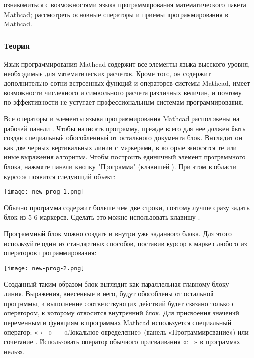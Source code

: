 
\goal ознакомиться с возможностями языка программирования математического пакета Mathcad; рассмотреть основные операторы и приемы программирования в Mathcad.

\subsubsection{Теория}
Язык программирования Mathcad содержит все элементы языка высокого уровня, необходимые для математических расчетов. Кроме того, он содержит дополнительно сотни встроенных функций и операторов системы Mathcad, имеет возможности численного и символьного расчета различных величин, и поэтому по эффективности не уступает профессиональным системам программирования.

Все операторы и элементы языка программирования Mathcad расположены на рабочей панели . 
Чтобы написать программу, прежде всего для нее должен быть создан специальный обособленный от остального документа блок. Выглядит он как две черных вертикальных линии с маркерами, в которые заносятся те или иные выражения алгоритма. Чтобы построить единичный элемент программного блока, нажмите панели кнопку "Программа" (клавишей \keys{]}). При этом в области курсора появится следующий объект:
\begin{center}
	\texttt{[image: new-prog-1.png]}
\end{center}

Обычно программа содержит больше чем две строки, поэтому лучше сразу задать блок из 5-6 маркеров. Сделать это можно использовать клавишу \keys{\enter}.

Программный блок можно создать и внутри уже заданного блока. Для этого используйте один из стандартных способов, поставив курсор в маркер любого из операторов программирования:
\begin{center}
	\texttt{[image: new-prog-2.png]}
\end{center}

Созданный таким образом блок выглядит как параллельная главному блоку линия. Выражения, внесенные в него, будут обособлены от остальной программы, и выполнение соответствующих действий будет связано только с оператором, к которому относится внутренний блок.
Для присвоения значений переменным и функциям в программах Mathcad используется специальный оператор: «$\leftarrow$» --- «Локальное определение» (панель «Программирование») или сочетание \keys{\shift + [} . Использовать оператор обычного присваивания «:=» в программах нельзя.

